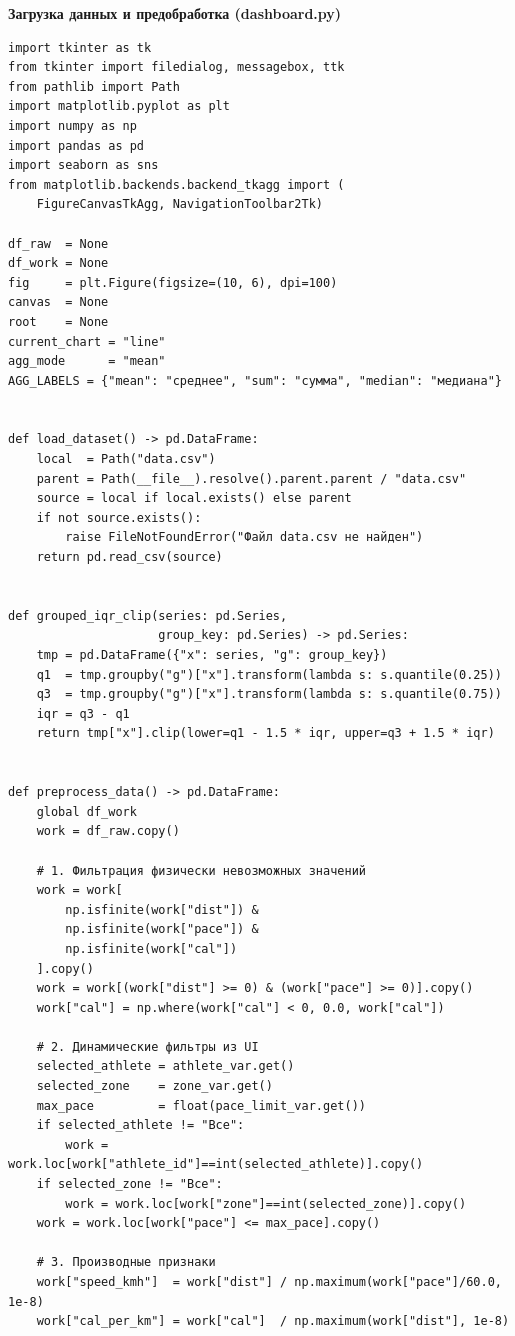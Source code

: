 \documentclass[oneside,a4paper,14pt]{extarticle}
\begin{document}
\newpage
\textbf{Загрузка данных и предобработка (dashboard.py)}
\small
\begin{verbatim}
import tkinter as tk
from tkinter import filedialog, messagebox, ttk
from pathlib import Path
import matplotlib.pyplot as plt
import numpy as np
import pandas as pd
import seaborn as sns
from matplotlib.backends.backend_tkagg import (
    FigureCanvasTkAgg, NavigationToolbar2Tk)

df_raw  = None
df_work = None
fig     = plt.Figure(figsize=(10, 6), dpi=100)
canvas  = None
root    = None
current_chart = "line"
agg_mode      = "mean"
AGG_LABELS = {"mean": "среднее", "sum": "сумма", "median": "медиана"}


def load_dataset() -> pd.DataFrame:
    local  = Path("data.csv")
    parent = Path(__file__).resolve().parent.parent / "data.csv"
    source = local if local.exists() else parent
    if not source.exists():
        raise FileNotFoundError("Файл data.csv не найден")
    return pd.read_csv(source)


def grouped_iqr_clip(series: pd.Series,
                     group_key: pd.Series) -> pd.Series:
    tmp = pd.DataFrame({"x": series, "g": group_key})
    q1  = tmp.groupby("g")["x"].transform(lambda s: s.quantile(0.25))
    q3  = tmp.groupby("g")["x"].transform(lambda s: s.quantile(0.75))
    iqr = q3 - q1
    return tmp["x"].clip(lower=q1 - 1.5 * iqr, upper=q3 + 1.5 * iqr)


def preprocess_data() -> pd.DataFrame:
    global df_work
    work = df_raw.copy()

    # 1. Фильтрация физически невозможных значений
    work = work[
        np.isfinite(work["dist"]) &
        np.isfinite(work["pace"]) &
        np.isfinite(work["cal"])
    ].copy()
    work = work[(work["dist"] >= 0) & (work["pace"] >= 0)].copy()
    work["cal"] = np.where(work["cal"] < 0, 0.0, work["cal"])

    # 2. Динамические фильтры из UI
    selected_athlete = athlete_var.get()
    selected_zone    = zone_var.get()
    max_pace         = float(pace_limit_var.get())
    if selected_athlete != "Все":
        work = work.loc[work["athlete_id"]==int(selected_athlete)].copy()
    if selected_zone != "Все":
        work = work.loc[work["zone"]==int(selected_zone)].copy()
    work = work.loc[work["pace"] <= max_pace].copy()

    # 3. Производные признаки
    work["speed_kmh"]  = work["dist"] / np.maximum(work["pace"]/60.0, 1e-8)
    work["cal_per_km"] = work["cal"]  / np.maximum(work["dist"], 1e-8)


\end{verbatim}
\end{document}

